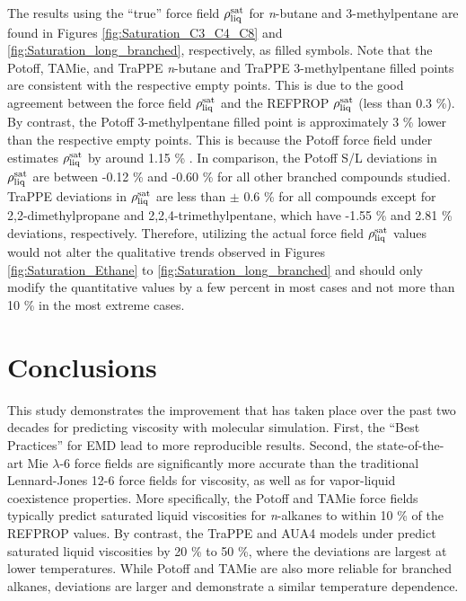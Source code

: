 \documentclass[preprint,review,12pt]{elsarticle}
\begin{document}
	The results using the ``true'' force field $\rho_{\rm liq}^{\rm sat}$ for \textit{n}-butane and 3-methylpentane are found in Figures \ref{fig:Saturation_C3_C4_C8} and \ref{fig:Saturation_long_branched}, respectively, as filled symbols. Note that the Potoff, TAMie, and TraPPE \textit{n}-butane and TraPPE 3-methylpentane filled points are consistent with the respective empty points. This is due to the good agreement between the force field $\rho_{\rm liq}^{\rm sat}$ and the REFPROP $\rho_{\rm liq}^{\rm sat}$ (less than 0.3 \%). By contrast, the Potoff 3-methylpentane filled point is approximately 3 \% lower than the respective empty points. This is because the Potoff force field under estimates $\rho_{\rm liq}^{\rm sat}$ by around 1.15 \% \cite{Potoff_branched}. In comparison, the Potoff S/L deviations in $\rho_{\rm liq}^{\rm sat}$ are between -0.12 \% and -0.60 \% for all other branched compounds studied. TraPPE deviations in $\rho_{\rm liq}^{\rm sat}$ are less than $\pm$ 0.6 \% for all compounds except for 2,2-dimethylpropane and 2,2,4-trimethylpentane, which have -1.55 \% and 2.81 \% deviations, respectively. Therefore, utilizing the actual force field $\rho_{\rm liq}^{\rm sat}$ values would not alter the qualitative trends observed in Figures \ref{fig:Saturation_Ethane} to \ref{fig:Saturation_long_branched} and should only modify the quantitative values by a few percent in most cases and not more than 10 \% in the most extreme cases.     
	
	
	\section{Conclusions} \label{Conclusions}
	
	This study demonstrates the improvement that has taken place over the past two decades for predicting viscosity with molecular simulation. First, the ``Best Practices'' for EMD lead to more reproducible results. Second, the state-of-the-art Mie $\lambda$-6 force fields are significantly more accurate than the traditional Lennard-Jones 12-6 force fields for viscosity, as well as for vapor-liquid coexistence properties. More specifically, the Potoff and TAMie force fields typically predict saturated liquid viscosities for \textit{n}-alkanes to within 10 \% of the REFPROP values. By contrast, the TraPPE and AUA4 models under predict saturated liquid viscosities by 20 \% to 50 \%, where the deviations are largest at lower temperatures. While Potoff and TAMie are also more reliable for branched alkanes, deviations are larger and demonstrate a similar temperature dependence. 
	
\end{document}
